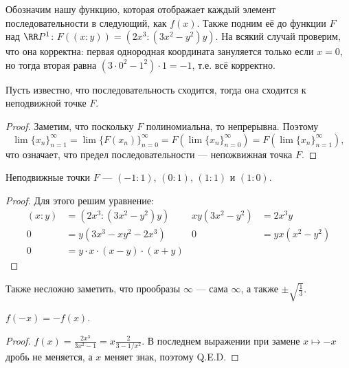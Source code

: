\documentclass[12pt,a4paper]{article}
\begin{document}
    \begin{enumproblem}[\textcolor{green}{сдано}]
        Обозначим нашу функцию, которая отображает каждый элемент последовательности в следующий, как $f(x)$. Также подним её до функции $F$ над $\RR P^1$: $F((x: y)) = (2x^3: (3x^2-y^2)y)$. На всякий случай проверим, что она корректна: первая однородная координата зануляется только если $x=0$, но тогда вторая равна $(3\cdot 0^2 - 1^2)\cdot 1= -1$, т.е. всё корректно.

        \begin{lemma}
            Пусть известно, что последовательность сходится, тогда она сходится к неподвижной точке $F$.
        \end{lemma}

        \begin{proof}
            Заметим, что поскольку $F$ полиномиальна, то непрерывна. Поэтому
            \[\lim \{x_n\}_{n=1}^\infty = \lim \{F(x_n)\}_{n=0}^\infty = F(\lim \{x_n\}_{n=0}^\infty) = F(\lim \{x_n\}_{n=1}^\infty),\]
            что означает, что предел последовательности --- непожвижная точка $F$.
        \end{proof}

        \begin{lemma}
            Неподвижные точки $F$ --- $(-1:1)$, $(0:1)$, $(1:1)$ и $(1:0)$.
        \end{lemma}

        \begin{proof}
            Для этого решим уравнение:
            \begin{align*}
                (x: y) &= (2x^3: (3x^2 - y^2)y)&
                xy(3x^2-y^2) &= 2x^3y\\
                0 &= y(3x^3 - xy^2 - 2x^3)&
                0 &= yx(x^2-y^2)\\
                0 &= y \cdot x \cdot (x - y) \cdot (x + y)
            \end{align*}
        \end{proof}

        Также несложно заметить, что прообразы $\infty$ --- сама $\infty$, а также $\pm \sqrt{\frac{1}{3}}$.

        \begin{lemma}
            $f(-x)=-f(x)$.
        \end{lemma}

        \begin{proof}
            $f(x) = \frac{2x^3}{3x^2 - 1} = x\frac{2}{3-1/x^2}$. В последнем выражении при замене $x \mapsto -x$ дробь не меняется, а $x$ меняет знак, поэтому Q.E.D. 
        \end{proof}


\end{enumproblem}
\end{document}
